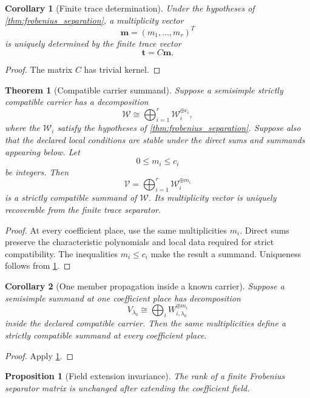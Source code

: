 \documentclass{aomart}
\newtheorem{theorem}{Theorem}[section]
\newtheorem{proposition}[proposition]{Proposition}
\newtheorem{corollary}[corollary]{Corollary}
\theoremstyle{definition}
\theoremstyle{remark}
\begin{document}
\begin{corollary}[Finite trace determination]\label{cor:finite_trace_determination}
Under the hypotheses of \cref{thm:frobenius_separation}, a multiplicity vector
\[
\bm m=(m_1,\ldots,m_r)^T
\]
is uniquely determined by the finite trace vector
\[
\bm t=C\bm m.
\]
\end{corollary}

\begin{proof}
The matrix \(C\) has trivial kernel.
\end{proof}

\begin{theorem}[Compatible carrier summand]\label{thm:compatible_carrier}
Suppose a semisimple strictly compatible carrier has a decomposition
\[
\mathcal W
\cong
\bigoplus_{i=1}^{r}
\mathcal W_i^{\oplus c_i},
\]
where the \(\mathcal W_i\) satisfy the hypotheses of \cref{thm:frobenius_separation}. Suppose also that the declared local conditions are stable under the direct sums and summands appearing below. Let
\[
0\leq m_i\leq c_i
\]
be integers. Then
\[
\boxed{
\mathcal V
=
\bigoplus_{i=1}^{r}
\mathcal W_i^{\oplus m_i}
}
\]
is a strictly compatible summand of \(\mathcal W\). Its multiplicity vector is uniquely recoverable from the finite trace separator.
\end{theorem}

\begin{proof}
At every coefficient place, use the same multiplicities \(m_i\). Direct sums preserve the characteristic polynomials and local data required for strict compatibility. The inequalities \(m_i\leq c_i\) make the result a summand. Uniqueness follows from \cref{cor:finite_trace_determination}.
\end{proof}

\begin{corollary}[One member propagation inside a known carrier]\label{cor:one_member_propagation}
Suppose a semisimple summand at one coefficient place has decomposition
\[
V_{\lambda_0}
\cong
\bigoplus_iW_{i,\lambda_0}^{\oplus m_i}
\]
inside the declared compatible carrier. Then the same multiplicities define a strictly compatible summand at every coefficient place.
\end{corollary}

\begin{proof}
Apply \cref{thm:compatible_carrier}.
\end{proof}

\begin{proposition}[Field extension invariance]\label{prop:field_extension_separator}
The rank of a finite Frobenius separator matrix is unchanged after extending the coefficient field.
\end{proposition}
\end{document}
